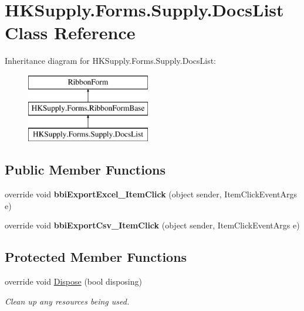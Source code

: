 \hypertarget{class_h_k_supply_1_1_forms_1_1_supply_1_1_docs_list}{}\section{H\+K\+Supply.\+Forms.\+Supply.\+Docs\+List Class Reference}
\label{class_h_k_supply_1_1_forms_1_1_supply_1_1_docs_list}
Inheritance diagram for H\+K\+Supply.\+Forms.\+Supply.\+Docs\+List\+:\begin{figure}[H]
\begin{center}
\leavevmode
\includegraphics[height=3.000000cm]{class_h_k_supply_1_1_forms_1_1_supply_1_1_docs_list}
\end{center}
\end{figure}
\subsection*{Public Member Functions}
\begin{DoxyCompactItemize}
\item 
\mbox{\label{class_h_k_supply_1_1_forms_1_1_supply_1_1_docs_list_a3ff0df976f3a4074168df3b4d142cff4}} 
override void {\bfseries bbi\+Export\+Excel\+\_\+\+Item\+Click} (object sender, Item\+Click\+Event\+Args e)
\item 
\mbox{\label{class_h_k_supply_1_1_forms_1_1_supply_1_1_docs_list_ab497e3a629ea56e701d81c3db8d18c27}} 
override void {\bfseries bbi\+Export\+Csv\+\_\+\+Item\+Click} (object sender, Item\+Click\+Event\+Args e)
\end{DoxyCompactItemize}
\subsection*{Protected Member Functions}
\begin{DoxyCompactItemize}
\item 
override void \mbox{\hyperlink{class_h_k_supply_1_1_forms_1_1_supply_1_1_docs_list_a7e58528667abfc7010b73671ed97e2eb}{Dispose}} (bool disposing)
\begin{DoxyCompactList}\small\item\em Clean up any resources being used. \end{DoxyCompactList}\end{DoxyCompactItemize}

